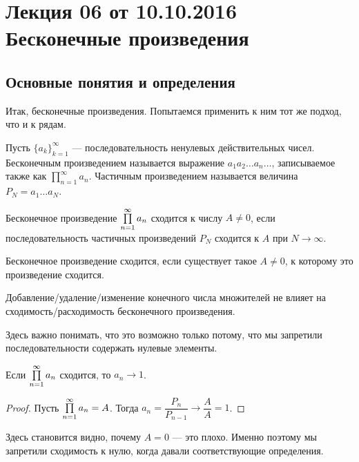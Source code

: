 \documentclass[a4paper, 12pt]{article}
\begin{document}
\pagestyle{fancy}
\section{Лекция 06 от 10.10.2016 \\ Бесконечные произведения}
\subsection{Основные понятия и определения}
Итак, бесконечные произведения. Попытаемся применить к ним тот же подход, что и к рядам.

\begin{Def}
Пусть $\{a_k\}_{k=1}^\infty$ --- последовательность ненулевых действительных чисел. Бесконечным произведением называется выражение $a_1 a_2 \ldots a_n \ldots$, записываемое также как $\prod\limits_{n=1}^{\infty}a_n$. Частичным произведением называется величина $P_N = a_1 \ldots a_N$.
\end{Def}

\begin{Def}
Бесконечное произведение $\prod\limits_{n=1}^{\infty} a_n$ сходится к числу $A \neq 0$, если последовательность частичных произведений $P_N$ сходится к $A$ при $N \to \infty$.
\end{Def}

\begin{Def}
Бесконечное произведение сходится, если существует такое $A \neq 0$, к которому это произведение сходится.
\end{Def}

\begin{Statement}
Добавление/удаление/изменение конечного числа множителей не влияет на сходимость/расходимость бесконечного произведения.
\end{Statement}

Здесь важно понимать, что это возможно только потому, что мы запретили последовательности содержать нулевые элементы.

\begin{Statement}
Если $\prod\limits_{n=1}^{\infty} a_n$ сходится, то $a_n \to 1$.
\end{Statement}

\begin{proof}
Пусть $\prod\limits_{n=1}^{\infty} a_n = A$. Тогда $a_n = \dfrac{P_n}{P_{n-1}} \to \dfrac{A}{A} = 1$.
\end{proof}

Здесь становится видно, почему $A=0$ --- это плохо. Именно поэтому мы запретили сходимость к нулю, когда давали соответствующие определения.
\end{document}
